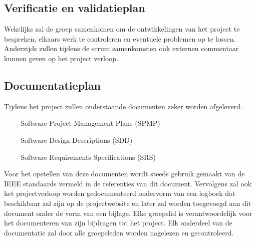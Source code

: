 \documentclass{article}
\begin{document}
\subsection{Verificatie en validatieplan}

Wekelijks zal de groep samenkomen om de ontwikkelingen van het project te bespreken, elkaars werk te controleren en eventuele problemen op te lossen. Anderzijds zullen tijdens de scrum samenkomsten ook externen commentaar kunnen geven op het project verloop.

\subsection{Documentatieplan}

Tijdens het project zullen onderstaande documenten zeker worden afgeleverd.
\begin{itemize}
\item[-] Software Project Management Plans (SPMP)\\[-5mm]
\item[-] Software Design Descriptions (SDD)\\[-5mm]
\item[-] Software Requirements Specifications (SRS)\\[-5mm]
\end{itemize}

Voor het opstellen van deze documenten wordt steeds gebruik gemaakt van de IEEE standaards vermeld in de referenties van dit document.
Vervolgens zal ook het projectverloop worden gedocumenteerd ondervorm van een logboek dat beschikbaar zal zijn op de projectwebsite en later zal worden toegevoegd aan dit document onder de vorm van een bijlage.
Elke groepslid is verantwoordelijk voor het documenteren van zijn bijdragen tot het project. Elk onderdeel van de documentatie zal door alle groepsleden worden nagelezen en gecontroleerd.

\end{document}
